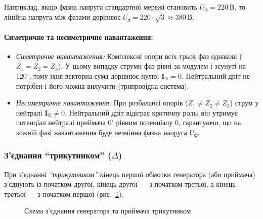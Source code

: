 Наприклад, якщо фазна напруга стандартної мережі становить $U_\text{ф} = 220~\text{В}$, то лінійна напруга між фазами дорівнює $U_\text{л} = 220 \cdot \sqrt{3} \approx 380~\text{В}$.

\paragraph{Симетричне та несиметричне навантаження:}
\begin{itemize}
    \item \emph{Симетричне навантаження:} Комплексні опори всіх трьох фаз однакові ($Z_1 = Z_2 = Z_3$). У цьому випадку струми фаз рівні за модулем і зсунуті на $120^\circ$, тому їхня векторна сума дорівнює нулю: $\mathbf{I}_\text{N} = 0$. Нейтральний дріт не потрібен і його можна вилучити (трипровідна система).
    \item \emph{Несиметричне навантаження:} При розбалансі опорів ($Z_1 \neq Z_2 \neq Z_3$) струм у нейтралі $\mathbf{I}_\text{N} \neq 0$. Нейтральний дріт відіграє критичну роль: він утримує потенціал нейтралі приймача $0'$ рівним потенціалу $0$, гарантуючи, що на кожній фазі навантаження буде незмінна фазна напруга $U_\text{ф}$.
\end{itemize}

\subsubsection{З'єднання \enquote{трикутником} ($\Delta$)}

При з'єднанні \emph{\enquote{трикутником}} кінець першої обмотки генератора (або приймача) з'єднують із початком другої, кінець другої --- з початком третьої, а кінець третьої --- з початком першої (рис.~\ref{pic:ThreePhaseDelta}).

\begin{figure}[h!]\centering
	\caption{Схема з'єднання генератора та приймача трикутником}
	\label{pic:ThreePhaseDelta}
\end{figure}

